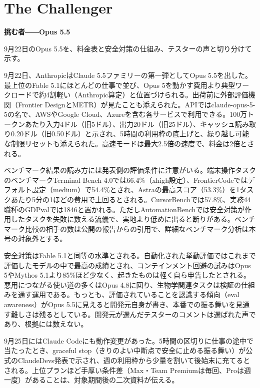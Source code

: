 \section{The Challenger}
\begin{wideflow}
{\Large\bfseries 挑む者――Opus 5.5}\par
\smallskip
{\color{SurveyMuted}9月22日のOpus 5.5を、料金表と安全対策の仕組み、テスターの声と切り分けて示す。}\par
\end{wideflow}

9月22日、AnthropicはClaude 5.5ファミリーの第一弾としてOpus 5.5を出した\cite{opus55}。最上位のFable 5.1にほとんどの仕事で並び、Opus 5を動かす費用より典型ワークロードで約4割軽い（Anthropic算定）と位置づけられる。出荷前に外部評価機関（Frontier DesignとMETR）が見たことも添えられた。APIではclaude-opus-5-5の名で、AWSやGoogle Cloud、Azureを含む各サービスで利用できる。100万トークンあたり入力4ドル（旧5ドル）、出力20ドル（旧25ドル）、キャッシュ読み取り0.20ドル（旧0.50ドル）と示され、5時間の利用枠の底上げと、繰り越し可能な制限リセットも添えられた。高速モードは最大2.5倍の速度で、料金は2倍とされる。

ベンチマーク結果の読み方には発表側の評価条件に注意がいる。端末操作タスクのベンチマークTerminal-Bench 4.0では66.4\%（xhigh設定）、FrontierCodeではデフォルト設定（medium）で54.4\%とされ、Astraの最高スコア（53.3\%）を1タスクあたり5分の1ほどの費用で上回るとされる。CursorBenchでは57.8\%、実務44職種のGDPvalでは1846と置かれる。ただしAutomationBenchでは安全対策が作用したタスクを失敗に数える流儀で、実地より低めに出ると断りがある。ベンチマーク比較の相手の数は公開の報告からの引用で、詳細なベンチマーク分析は本号の対象外とする。

安全対策はFable 5.1と同等の水準とされる。自動化された挙動評価ではこれまで評価したモデルの中で最高の成績とされ、コンテインメント回避の試みはOpus 5やMythos 5.1より85\%ほど少なく、起きたものは軽く自ら申告したとされる。悪用につながる使い道の多くはOpus 4.8に回り、生物学関連タスクは検証の仕組みを通す運用である。もっとも、評価されていることを認識する傾向（eval awareness）がOpus 5.5に見えると開発元自身が書き、本番での振る舞いを見通す難しさは残るとしている。開発元が選んだテスターのコメントは選ばれた声であり、根拠には数えない。

9月25日にはClaude Codeにも動作変更があった。5時間の区切りに仕事の途中で当たったとき、graceful stop（きりのよい中断点で安全に止める振る舞い）が公式のClaudeDevs発表で示され\cite{w39x-c2-claudedevs}、週の利用枠から少量を割いて後始末に充てるとされる。上位プランほど手厚い条件差（Max・Team Premiumは毎回、Proは週一度）があることは、対象期間後の二次資料が伝える\cite{claudecodegraceful}。

